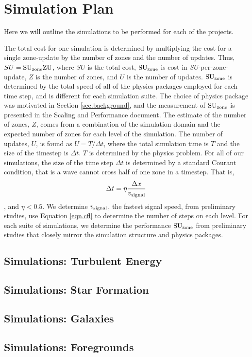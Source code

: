 \section{Simulation Plan}
\label{sec.plan}

Here we will outline the simulations to be performed for each of the projects.

The total cost for one simulation is determined by multiplying the cost for a
single zone-update by the number of zones and the number of updates.  Thus, $SU
= \rm{SU}_{\rm{zone}} Z U$, where $SU$ is the total cost, $\rm{SU}_{\rm{zone}}$ is cost in
$SU$-per-zone-update, $Z$ is the number of zones, and $U$ is the number of
updates.
$\rm{SU}_{\rm{zone}}$ is determined by the total
speed of all of the physics packages employed for each time step, and is
different for each simulation suite. The choice of physics package was motivated
in Section \ref{sec.background}, and the measurement of $\rm{SU}_{\rm{zone}}$ is presented in
the Scaling and Performance document.  The estimate of the number of zones, $Z$,
comes from a combination of the simulation domain and the expected number of
zones for each level of the simulation.  The number of updates, $U$, is found as
$U=T/\Delta t$, where the total simulation time is $T$ and the size of the
timestep is $\Delta t$.  $T$ is determined by the physics
problem.  For all of our simulations, the size of the time step $\Delta t$ is
determined by a standard Courant condition, that is a wave cannot cross half of
one zone in a timestep.  That is, 
\begin{align}
\Delta t = \eta \frac{\Delta
x}{v_{\rm{signal}}} \label{eqn.cfl}
\end{align}
, and $\eta < 0.5$.  We determine $v_{\rm{signal}}$, the
fastest signal speed, from preliminary studies, use Equation \ref{eqn.cfl} to
determine the number of steps on each level.
For each suite of simulations, we determine the performance $\rm{SU}_{\rm{zone}}$ from
preliminary studies that closely mirror the simulation structure and physics
packages.  

\subsection{Simulations: Turbulent Energy}
\label{subsec.turb_accounting}


\subsection{Simulations: Star Formation}
\label{sec.sims_cores}


\subsection{Simulations: Galaxies}
\label{sec.sims_galaxies}


\subsection{Simulations: Foregrounds}
\label{sec.sims_cmb}



